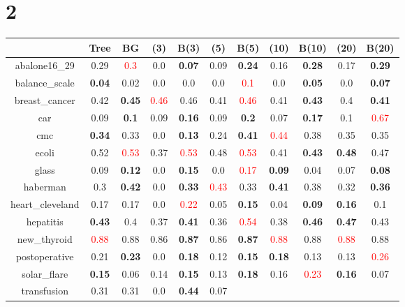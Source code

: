 \documentclass{article}%
\begin{document}
\section*{2}%
\begin{tabular}{c|cccccccccc}%
\hline%
&Tree&BG&(3)&B(3)&(5)&B(5)&(10)&B(10)&(20)&B(20)\\%
\hline%
abalone16\_29&0.29&\textcolor{red}{ 
0.3
}&0.0&\textbf{0.07}&0.09&\textbf{0.24}&0.16&\textbf{0.28}&0.17&\textbf{0.29}\\%
\hline%
balance\_scale&\textbf{0.04}&0.02&0.0&0.0&0.0&\textcolor{red}{ 
0.1
}&0.0&\textbf{0.05}&0.0&\textbf{0.07}\\%
\hline%
breast\_cancer&0.42&\textbf{0.45}&\textcolor{red}{ 
0.46
}&0.46&0.41&\textcolor{red}{ 
0.46
}&0.41&\textbf{0.43}&0.4&\textbf{0.41}\\%
\hline%
car&0.09&\textbf{0.1}&0.09&\textbf{0.16}&0.09&\textbf{0.2}&0.07&\textbf{0.17}&0.1&\textcolor{red}{ 
0.67
}\\%
\hline%
cmc&\textbf{0.34}&0.33&0.0&\textbf{0.13}&0.24&\textbf{0.41}&\textcolor{red}{ 
0.44
}&0.38&0.35&0.35\\%
\hline%
ecoli&0.52&\textcolor{red}{ 
0.53
}&0.37&\textcolor{red}{ 
0.53
}&0.48&\textcolor{red}{ 
0.53
}&0.41&\textbf{0.43}&\textbf{0.48}&0.47\\%
\hline%
glass&0.09&\textbf{0.12}&0.0&\textbf{0.15}&0.0&\textcolor{red}{ 
0.17
}&\textbf{0.09}&0.04&0.07&\textbf{0.08}\\%
\hline%
haberman&0.3&\textbf{0.42}&0.0&\textbf{0.33}&\textcolor{red}{ 
0.43
}&0.33&\textbf{0.41}&0.38&0.32&\textbf{0.36}\\%
\hline%
heart\_cleveland&0.17&0.17&0.0&\textcolor{red}{ 
0.22
}&0.05&\textbf{0.15}&0.04&\textbf{0.09}&\textbf{0.16}&0.1\\%
\hline%
hepatitis&\textbf{0.43}&0.4&0.37&\textbf{0.41}&0.36&\textcolor{red}{ 
0.54
}&0.38&\textbf{0.46}&\textbf{0.47}&0.43\\%
\hline%
new\_thyroid&\textcolor{red}{ 
0.88
}&0.88&0.86&\textbf{0.87}&0.86&\textbf{0.87}&\textcolor{red}{ 
0.88
}&0.88&\textcolor{red}{ 
0.88
}&0.88\\%
\hline%
postoperative&0.21&\textbf{0.23}&0.0&\textbf{0.18}&0.12&\textbf{0.15}&\textbf{0.18}&0.13&0.13&\textcolor{red}{ 
0.26
}\\%
\hline%
solar\_flare&\textbf{0.15}&0.06&0.14&\textbf{0.15}&0.13&\textbf{0.18}&0.16&\textcolor{red}{ 
0.23
}&\textbf{0.16}&0.07\\%
\hline%
transfusion&0.31&0.31&0.0&\textbf{0.44}&0.07&\textcolor{red}{ 
}
\end{tabular}
\end{document}
